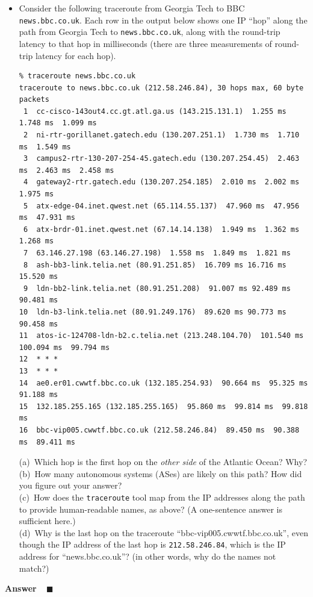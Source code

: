 \documentclass[11pt]{article}
\newcounter{pctr}
\newcommand{\sols}[1]{#1}
\newcommand{\sols}[1]{}
\newcounter{answer}
\newenvironment{answer}[1][\relax]{\refstepcounter{answer}\begin{list}%
 {}{\leftmargin 0pt\rightmargin 0pt\labelsep 3pt\parsep 0pt%
 \setlength{\listparindent}{\parindent}}
    \item {\bf Answer \theanswer #1}\
    }{\hspace*{\fill}$\blacksquare$\end{list}}
\newcommand\prob[1]%
  {\begin{itemize}\item[]%
   \vspace{.2in}{\bf\thepctr. ~[#1~ points]:}\stepcounter{pctr}}
\newcommand\eprob{\end{itemize}}
\begin{document}
\pagebreak
\prob{8} Consider the following traceroute from Georgia Tech to
BBC {\tt news.bbc.co.uk}.  Each row in the output below shows one IP
``hop'' along the path from Georgia Tech to {\tt news.bbc.co.uk}, along
with the round-trip latency to that hop in milliseconds (there are three
measurements of round-trip latency for each hop).
\begin{scriptsize}
\begin{verbatim}
% traceroute news.bbc.co.uk
traceroute to news.bbc.co.uk (212.58.246.84), 30 hops max, 60 byte packets
 1  cc-cisco-143out4.cc.gt.atl.ga.us (143.215.131.1)  1.255 ms  1.748 ms  1.099 ms
 2  ni-rtr-gorillanet.gatech.edu (130.207.251.1)  1.730 ms  1.710 ms  1.549 ms
 3  campus2-rtr-130-207-254-45.gatech.edu (130.207.254.45)  2.463 ms  2.463 ms  2.458 ms
 4  gateway2-rtr.gatech.edu (130.207.254.185)  2.010 ms  2.002 ms  1.975 ms
 5  atx-edge-04.inet.qwest.net (65.114.55.137)  47.960 ms  47.956 ms  47.931 ms
 6  atx-brdr-01.inet.qwest.net (67.14.14.138)  1.949 ms  1.362 ms  1.268 ms
 7  63.146.27.198 (63.146.27.198)  1.558 ms  1.849 ms  1.821 ms
 8  ash-bb3-link.telia.net (80.91.251.85)  16.709 ms 16.716 ms 15.520 ms
 9  ldn-bb2-link.telia.net (80.91.251.208)  91.007 ms 92.489 ms 90.481 ms
10  ldn-b3-link.telia.net (80.91.249.176)  89.620 ms 90.773 ms 90.458 ms
11  atos-ic-124708-ldn-b2.c.telia.net (213.248.104.70)  101.540 ms  100.094 ms  99.794 ms
12  * * *
13  * * *
14  ae0.er01.cwwtf.bbc.co.uk (132.185.254.93)  90.664 ms  95.325 ms  91.188 ms
15  132.185.255.165 (132.185.255.165)  95.860 ms  99.814 ms  99.818 ms
16  bbc-vip005.cwwtf.bbc.co.uk (212.58.246.84)  89.450 ms  90.388 ms  89.411 ms
\end{verbatim}
\end{scriptsize}
(a)~Which hop is the first hop on the {\em other side} of the Atlantic
Ocean?  Why? \\
(b)~How many autonomous systems (ASes) are likely on this path?  How did
you figure out your answer? \\
(c)~How does the {\tt traceroute} tool map from the IP addresses along
the path to provide human-readable names, as above? (A one-sentence
answer is sufficient here.) \\
(d)~Why is the last hop on the traceroute
``bbc-vip005.cwwtf.bbc.co.uk'', even though the IP address of the last
hop is {\tt 212.58.246.84}, which is the IP address for
``news.bbc.co.uk''?  (in other words, why do the names not match?)
\vspace{1.75in}
\eprob

\sols{
\vspace{-1.25in}
\begin{answer}
\end{answer}
}
\end{document}
